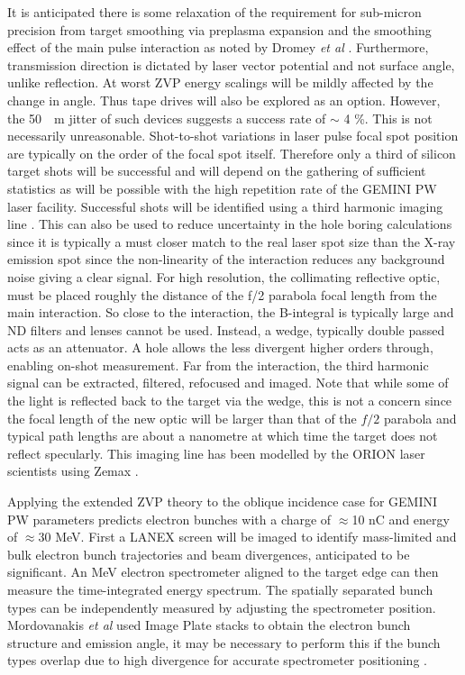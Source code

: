 It is anticipated there is some relaxation of the requirement for sub-micron precision from target smoothing via preplasma expansion and the smoothing effect of the main pulse interaction as noted by Dromey \textit{et al} \cite{dromeyDiffractionlimitedPerformanceFocusing2009}. Furthermore, transmission direction is dictated by laser vector potential and not surface angle, unlike reflection. At worst ZVP energy scalings will be mildly affected by the change in angle. Thus tape drives will also be explored as an option. However, the \qty{50}{\mu m} jitter of such devices suggests a success rate of $\sim$ 4 \%. This is not necessarily unreasonable. Shot-to-shot variations in laser pulse focal spot position are typically on the order of the focal spot itself. Therefore only a third of silicon target shots will be successful and will depend on the gathering of sufficient statistics as will be possible with the high repetition rate of the GEMINI PW laser facility. Successful shots will be identified using a third harmonic imaging line \cite{dromeyDiffractionlimitedPerformanceFocusing2009}. This can also be used to reduce uncertainty in the hole boring calculations since it is typically a must closer match to the real laser spot size than the X-ray emission spot since the non-linearity of the interaction reduces any background noise giving a clear signal. For high resolution, the collimating reflective optic, must be placed roughly the distance of the f/2 parabola focal length from the main interaction. So close to the interaction, the B-integral is typically large and ND filters and lenses cannot be used. Instead, a wedge, typically double passed acts as an attenuator. A hole allows the less divergent higher orders through, enabling on-shot measurement. Far from the interaction, the third harmonic signal can be extracted, filtered, refocused and imaged. Note that while some of the light is reflected back to the target via the wedge, this is not a concern since the focal length of the new optic will be larger than that of the $f/2$ parabola and typical path lengths are about a nanometre at which time the target does not reflect specularly. This imaging line has been modelled by the ORION laser scientists using Zemax \cite{AnsysZemaxOpticStudio}. 



Applying the extended ZVP theory to the oblique incidence case for GEMINI PW parameters predicts electron bunches with a charge of $\approx$10 nC and energy of $\approx$30 MeV.
First a LANEX screen will be imaged to identify mass-limited and bulk electron bunch trajectories and beam divergences, anticipated to be significant. An MeV electron spectrometer aligned to the target edge can then measure the time-integrated energy spectrum. The spatially separated bunch types can be independently measured by adjusting the spectrometer position. Mordovanakis \textit{et al} used Image Plate stacks to obtain the electron bunch structure and emission angle, it may be necessary to perform this if the bunch types overlap due to high divergence for accurate spectrometer positioning \cite{mordovanakisQuasimonoenergeticElectronBeams2009}. 

